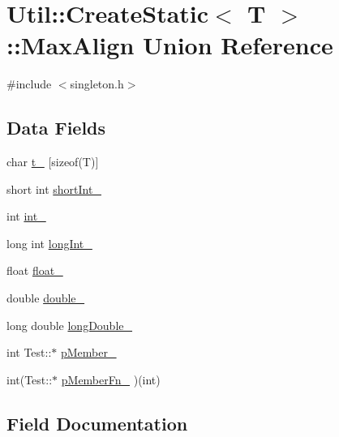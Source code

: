 \hypertarget{unionUtil_1_1CreateStatic_1_1MaxAlign}{}\section{Util\+:\+:Create\+Static$<$ T $>$\+:\+:Max\+Align Union Reference}
\label{unionUtil_1_1CreateStatic_1_1MaxAlign}


{\ttfamily \#include $<$singleton.\+h$>$}

\subsection*{Data Fields}
\begin{DoxyCompactItemize}
\item 
char \mbox{\hyperlink{unionUtil_1_1CreateStatic_1_1MaxAlign_afd4240e90cbb2875a201cea03af46086}{t\+\_\+}} \mbox{[}sizeof(T)\mbox{]}
\item 
short int \mbox{\hyperlink{unionUtil_1_1CreateStatic_1_1MaxAlign_a334412ad4ce26924cece7d29af8e8631}{short\+Int\+\_\+}}
\item 
int \mbox{\hyperlink{unionUtil_1_1CreateStatic_1_1MaxAlign_aea688b199aa435ffaa35eb2e0b986cd1}{int\+\_\+}}
\item 
long int \mbox{\hyperlink{unionUtil_1_1CreateStatic_1_1MaxAlign_aee4083ed377332dbf0ead2b4fe1e80ff}{long\+Int\+\_\+}}
\item 
float \mbox{\hyperlink{unionUtil_1_1CreateStatic_1_1MaxAlign_ae5154afb3d7310febaec42ff511b8f9b}{float\+\_\+}}
\item 
double \mbox{\hyperlink{unionUtil_1_1CreateStatic_1_1MaxAlign_ab57b1c1050f4571aa201bb58b5fd80cb}{double\+\_\+}}
\item 
long double \mbox{\hyperlink{unionUtil_1_1CreateStatic_1_1MaxAlign_a89c1747e50de01b0327001860b87340a}{long\+Double\+\_\+}}
\item 
int Test\+::$\ast$ \mbox{\hyperlink{unionUtil_1_1CreateStatic_1_1MaxAlign_ae0441c9ede3e81eade1cef3f6c1b1711}{p\+Member\+\_\+}}
\item 
int(Test\+::$\ast$ \mbox{\hyperlink{unionUtil_1_1CreateStatic_1_1MaxAlign_a2b799638aa7002aa5548ab67aae7e9e9}{p\+Member\+Fn\+\_\+}} )(int)
\end{DoxyCompactItemize}


\subsection{Field Documentation}
\mbox{\label{unionUtil_1_1CreateStatic_1_1MaxAlign_ab57b1c1050f4571aa201bb58b5fd80cb}} 
